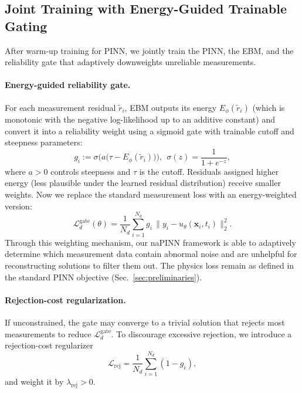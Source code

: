 \documentclass{article}
\theoremstyle{plain}
\theoremstyle{definition}
\theoremstyle{remark}
\begin{document}
\subsection{Joint Training with Energy-Guided Trainable Gating}
\label{subsec:stage2}
After warm-up training for PINN, we jointly train the PINN, the EBM, and the reliability gate that adaptively downweights unreliable measurements.

\paragraph{Energy-guided reliability gate.}
For each measurement residual $\tilde r_i$, EBM outputs its energy $E_\phi(\tilde r_i)$ (which is monotonic with the negative log-likelihood up to an additive constant) and convert it into a reliability weight using a sigmoid gate with trainable cutoff and steepness parameters:
\begin{equation}
g_i
:= \sigma\!\Big( a \big(\tau - E_\phi(\tilde r_i)\big)\Big), \ \ \sigma(z)=\frac{1}{1+e^{-z}},
\label{eq:gate}
\end{equation}
where $a>0$ controls steepness and $\tau$ is the cutoff. Residuals assigned higher energy (less plausible under the learned residual distribution) receive smaller weights. Now we replace the standard measurement loss with an energy-weighted version:
\begin{equation}
\mathcal{L}_{d}^{\text{gate}}(\theta)
= \frac{1}{N_d}\sum_{i=1}^{N_d} g_i \, \|y_i - u_\theta(\mathbf{x}_i,t_i)\|_2^2.
\label{eq:gated_data}
\end{equation}
Through this weighting mechanism, our naPINN framework is able to adaptively determine which measurement data contain abnormal noise and are unhelpful for reconstructing solutions to filter them out. The physics loss remain as defined in the standard PINN objective (Sec.~\ref{sec:preliminaries}).

\paragraph{Rejection-cost regularization.}
If unconstrained, the gate may converge to a trivial solution that rejects most measurements to reduce $\mathcal{L}_{d}^{\text{gate}}$. To discourage excessive rejection, we introduce a rejection-cost regularizer
\begin{equation}
\mathcal{L}_{\text{rej}}
= \frac{1}{N_d}\sum_{i=1}^{N_d} (1-g_i),
\label{eq:rej_cost}
\end{equation}
and weight it by $\lambda_{\text{rej}}>0$.
\end{document}

